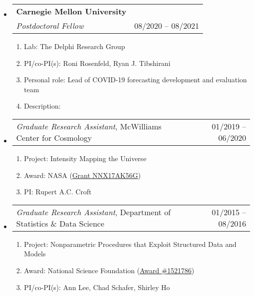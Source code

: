 \documentclass[letterpaper,10pt]{article}
\makeatletter
\newcommand{\subheadingoneline}[2]{
\begin{tabular*}{6.45in}{l@{\cftdotfill{\cftsecdotsep}\extracolsep{\fill}}r}
#1 & #2 \\ 
\end{tabular*}}
\newcommand{\subheadingtwolines}[4]{
\begin{tabular*}{6.45in}{l@{\cftdotfill{\cftsecdotsep}\extracolsep{\fill}}r}
#1 & #2 \\
#3 & #4 \\
\end{tabular*}}
\makeatother
\begin{document}
\begin{itemize}[leftmargin=0.4cm, itemsep=0.5cm]

\item[] \subheadingtwolines{\bf Carnegie Mellon University}{}{\emph{Postdoctoral Fellow}}{08/2020 -- 08/2021}
\vspace{-0.1cm}

\begin{enumerate}[leftmargin=0.5cm, itemsep=-0.05ex]
	\item[] Lab: The Delphi Research Group
	\item[] PI/co-PI(s): Roni Rosenfeld, Ryan J. Tibshirani
	\item[] Personal role: Lead of COVID-19 forecasting development and evaluation team
	\item[] Description:
\vspace{-0.1cm}
{}
\end{enumerate}

\item[] \subheadingoneline{{\it Graduate Research Assistant}, McWilliams Center for Cosmology}{01/2019 -- 06/2020}
\vspace{-0.1cm}

\begin{enumerate}[leftmargin=0.5cm, itemsep=-0.05ex]
	\item[] Project: Intensity Mapping the Universe
	\item[] Award: NASA (\href{http://adsabs.harvard.edu/abs/2016atp..prop...26C}{Grant NNX17AK56G})
	\item[] PI: Rupert A.C. Croft
\end{enumerate}

\item[] \subheadingoneline{{\it Graduate Research Assistant}, Department of Statistics \& Data Science}{01/2015 -- 08/2016}
\vspace{-0.1cm}

\begin{enumerate}[leftmargin=0.5cm, itemsep=-0.05ex]
	\item[] Project: Nonparametric Procedures that Exploit Structured Data and Models 
	\item[] Award: National Science Foundation (\href{https://www.nsf.gov/awardsearch/showAward?AWD_ID=1521786}{Award \#1521786})
	\item[] PI/co-PI(s): Ann Lee, Chad Schafer, Shirley Ho
\end{enumerate}


\end{itemize}
\end{document}
